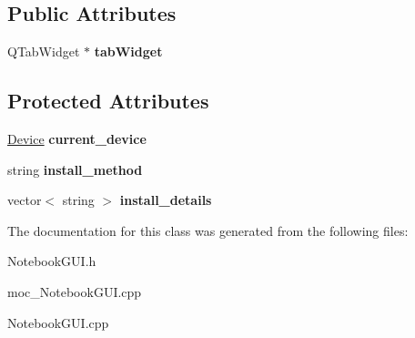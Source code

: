 \subsection*{Public Attributes}
\begin{DoxyCompactItemize}
\item 
\mbox{\label{classNotebookGUI_a21113dc7b67c66e88563059644af1f26}} 
Q\+Tab\+Widget $\ast$ {\bfseries tab\+Widget}
\end{DoxyCompactItemize}
\subsection*{Protected Attributes}
\begin{DoxyCompactItemize}
\item 
\mbox{\label{classNotebookGUI_a2beef42206665f7937636774a3881e5b}} 
\hyperlink{classDevice}{Device} {\bfseries current\+\_\+device}
\item 
\mbox{\label{classNotebookGUI_a49bf58ca1ac34fb077e82e7fd864eea4}} 
string {\bfseries install\+\_\+method}
\item 
\mbox{\label{classNotebookGUI_a3a8ce87e5a4a03d8d500268bcfa835b3}} 
vector$<$ string $>$ {\bfseries install\+\_\+details}
\end{DoxyCompactItemize}


The documentation for this class was generated from the following files\+:\begin{DoxyCompactItemize}
\item 
Notebook\+G\+U\+I.\+h\item 
moc\+\_\+\+Notebook\+G\+U\+I.\+cpp\item 
Notebook\+G\+U\+I.\+cpp\end{DoxyCompactItemize}
